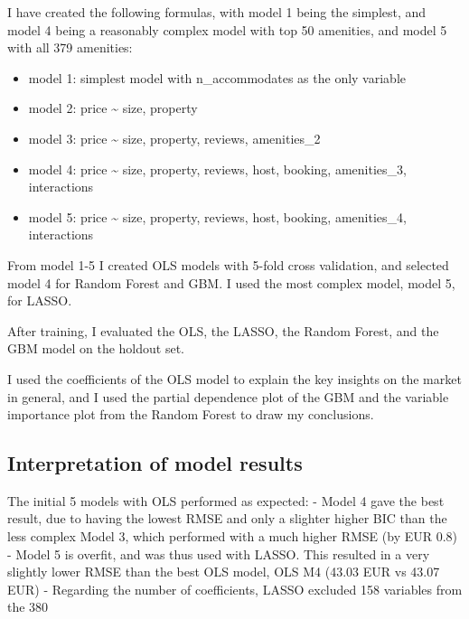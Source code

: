 \documentclass[
]{article}
\providecommand{\tightlist}{%
  \setlength{\itemsep}{0pt}\setlength{\parskip}{0pt}}
\begin{document}
I have created the following formulas, with model 1 being the simplest,
and model 4 being a reasonably complex model with top 50 amenities, and
model 5 with all 379 amenities:

\begin{itemize}
\tightlist
\item
  model 1: simplest model with n\_accommodates as the only variable
\item
  model 2: price \textasciitilde{} size, property
\item
  model 3: price \textasciitilde{} size, property, reviews, amenities\_2
\item
  model 4: price \textasciitilde{} size, property, reviews, host,
  booking, amenities\_3, interactions
\item
  model 5: price \textasciitilde{} size, property, reviews, host,
  booking, amenities\_4, interactions
\end{itemize}

From model 1-5 I created OLS models with 5-fold cross validation, and
selected model 4 for Random Forest and GBM. I used the most complex
model, model 5, for LASSO.

After training, I evaluated the OLS, the LASSO, the Random Forest, and
the GBM model on the holdout set.

I used the coefficients of the OLS model to explain the key insights on
the market in general, and I used the partial dependence plot of the GBM
and the variable importance plot from the Random Forest to draw my
conclusions.

\hypertarget{interpretation-of-model-results}{%
\subsection{Interpretation of model
results}\label{interpretation-of-model-results}}

The initial 5 models with OLS performed as expected: - Model 4 gave the
best result, due to having the lowest RMSE and only a slighter higher
BIC than the less complex Model 3, which performed with a much higher
RMSE (by EUR 0.8) - Model 5 is overfit, and was thus used with LASSO.
This resulted in a very slightly lower RMSE than the best OLS model, OLS
M4 (43.03 EUR vs 43.07 EUR) - Regarding the number of coefficients,
LASSO excluded 158 variables from the 380
\end{document}
